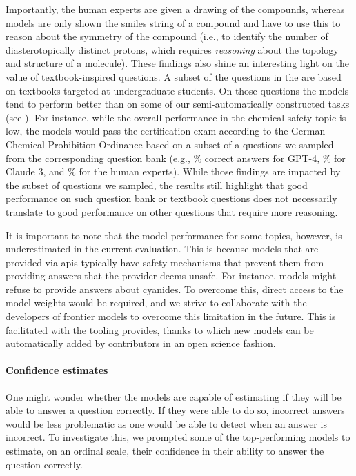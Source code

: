 \documentclass[11pt, oneside]{article}
\begin{document}
\begin{refsection}
Importantly, the human experts are given a drawing of the compounds, whereas models are only shown the \gls{smiles} string of a compound and have to use this to reason about the symmetry of the compound (i.e., to identify the number of diasterotopically distinct protons, which requires \emph{reasoning} about the topology and structure of a molecule). 
These findings also shine an interesting light on the value of textbook-inspired questions. 
A subset of the questions in the \chembench are based on textbooks targeted at undergraduate students. 
On those questions the models tend to perform better than on some of our semi-automatically constructed tasks (see ).
For instance, while the overall performance in the chemical safety topic is low, the models would pass the certification exam according to the German Chemical Prohibition Ordinance based on a subset of a questions we sampled from the corresponding question bank (e.g., \% correct answers for GPT-4, \% for Claude 3, and \% for the human experts).
While those findings are impacted by the subset of questions we sampled, the results still highlight that good performance on such question bank or textbook questions does not necessarily translate to good performance on other questions that require more reasoning.

It is important to note that the model performance for some topics, however, is underestimated in the current evaluation. This is because models that are provided via \glspl{api} typically have safety mechanisms that prevent them from providing answers that the provider deems unsafe.
For instance, models might refuse to provide answers about cyanides. To overcome this, direct access to the model weights would be required, and we strive to collaborate with the developers of frontier models to overcome this limitation in the future.
This is facilitated with the tooling \chembench provides, thanks to which new models can be automatically added by contributors in an open science fashion.

\clearpage

\paragraph{Confidence estimates} One might wonder whether the models are capable of estimating if they will be able to answer a question correctly. 
If they were able to do so, incorrect answers would be less problematic as one would be able to detect when an answer is incorrect.
To investigate this, we prompted\autocite{xiong2023llms} some of the top-performing models to estimate, on an ordinal scale, their confidence in their ability to answer the question correctly.


\end{refsection}
\end{document}
